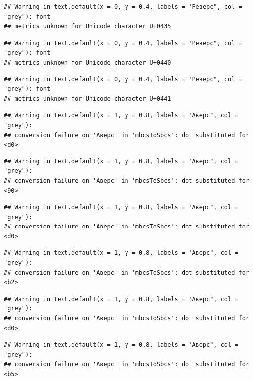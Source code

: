 \documentclass[
  11pt,
]{book}
\begin{document}
\begin{verbatim}
## Warning in text.default(x = 0, y = 0.4, labels = "Реверс", col = "grey"): font
## metrics unknown for Unicode character U+0435
\end{verbatim}

\begin{verbatim}
## Warning in text.default(x = 0, y = 0.4, labels = "Реверс", col = "grey"): font
## metrics unknown for Unicode character U+0440
\end{verbatim}

\begin{verbatim}
## Warning in text.default(x = 0, y = 0.4, labels = "Реверс", col = "grey"): font
## metrics unknown for Unicode character U+0441
\end{verbatim}

\begin{verbatim}
## Warning in text.default(x = 1, y = 0.8, labels = "Аверс", col = "grey"):
## conversion failure on 'Аверс' in 'mbcsToSbcs': dot substituted for <d0>
\end{verbatim}

\begin{verbatim}
## Warning in text.default(x = 1, y = 0.8, labels = "Аверс", col = "grey"):
## conversion failure on 'Аверс' in 'mbcsToSbcs': dot substituted for <90>
\end{verbatim}

\begin{verbatim}
## Warning in text.default(x = 1, y = 0.8, labels = "Аверс", col = "grey"):
## conversion failure on 'Аверс' in 'mbcsToSbcs': dot substituted for <d0>
\end{verbatim}

\begin{verbatim}
## Warning in text.default(x = 1, y = 0.8, labels = "Аверс", col = "grey"):
## conversion failure on 'Аверс' in 'mbcsToSbcs': dot substituted for <b2>
\end{verbatim}

\begin{verbatim}
## Warning in text.default(x = 1, y = 0.8, labels = "Аверс", col = "grey"):
## conversion failure on 'Аверс' in 'mbcsToSbcs': dot substituted for <d0>
\end{verbatim}

\begin{verbatim}
## Warning in text.default(x = 1, y = 0.8, labels = "Аверс", col = "grey"):
## conversion failure on 'Аверс' in 'mbcsToSbcs': dot substituted for <b5>
\end{verbatim}
\end{document}
